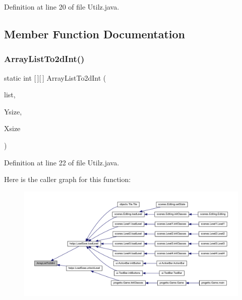 Definition at line 20 of file Utilz.\+java.



\subsection{Member Function Documentation}
\mbox{\label{classhelpz_1_1_utilz_a3f701300276e5102efe8c55e65192dec}} 
\subsubsection{\texorpdfstring{Array\+List\+To2d\+Int()}{ArrayListTo2dInt()}}
{\footnotesize\ttfamily static int \mbox{[}$\,$\mbox{]}\mbox{[}$\,$\mbox{]} Array\+List\+To2d\+Int (\begin{DoxyParamCaption}\item[{Array\+List$<$ Integer $>$}]{list,  }\item[{int}]{Ysize,  }\item[{int}]{Xsize }\end{DoxyParamCaption})\hspace{0.3cm}{\ttfamily [static]}}



Definition at line 22 of file Utilz.\+java.

Here is the caller graph for this function\+:\nopagebreak
\begin{figure}[H]
\begin{center}
\leavevmode
\includegraphics[width=350pt]{classhelpz_1_1_utilz_a3f701300276e5102efe8c55e65192dec_icgraph}
\end{center}
\end{figure}
\mbox{\label{classhelpz_1_1_utilz_a8a4c702547acd44cb113b787ae1d3e05}} 
